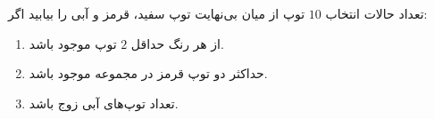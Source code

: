     \p 
تعداد حالات انتخاب
$10$
توپ از میان بی‌نهایت توپ سفید، قرمز و آبی را بیابید اگر:
\begin{enumerate}
\item
از هر رنگ حداقل
$2$
توپ موجود باشد.
\item
حداکثر دو توپ قرمز در مجموعه موجود باشد.
\item
تعداد توپ‌های آبی زوج باشد.
\end{enumerate}